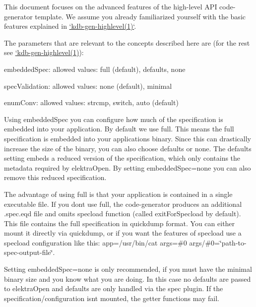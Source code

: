 This document focuses on the advanced features of the high-\/level A\+PI code-\/generator template. We assume you already familiarized yourself with the basic features explained in \hyperlink{doc_help_kdb-gen-highlevel_md}{`kdb-\/gen-\/highlevel(1)`}.

The parameters that are relevant to the concepts described here are (for the rest see \hyperlink{doc_help_kdb-gen-highlevel_md}{`kdb-\/gen-\/highlevel(1)})\+:


\begin{DoxyItemize}
\item {\ttfamily embedded\+Spec}\+: allowed values\+: {\ttfamily full} (default), {\ttfamily defaults}, {\ttfamily none}
\item {\ttfamily spec\+Validation}\+: allowed values\+: {\ttfamily none} (default), {\ttfamily minimal}
\item {\ttfamily enum\+Conv}\+: allowed values\+: {\ttfamily strcmp}, {\ttfamily switch}, {\ttfamily auto} (default)
\end{DoxyItemize}

Using {\ttfamily embedded\+Spec} you can configure how much of the specification is embedded into your application. By default we use {\ttfamily full}. This means the full specification is embedded into your application\textquotesingle{}s binary. Since this can drastically increase the size of the binary, you can also choose {\ttfamily defaults} or {\ttfamily none}. The {\ttfamily defaults} setting embeds a reduced version of the specification, which only contains the metadata required by {\ttfamily elektra\+Open}. By setting {\ttfamily embedded\+Spec=none} you can also remove this reduced specification.

The advantage of using {\ttfamily full} is that your application is contained in a single executable file. If you don\textquotesingle{}t use {\ttfamily full}, the code-\/generator produces an additional {\ttfamily .spec.\+eqd} file and omits specload function (called {\ttfamily exit\+For\+Specload} by default). This file contains the full specification in quickdump format. You can either mount it directly via {\ttfamily quickdump}, or if you want the features of {\ttfamily specload} use a {\ttfamily specload} configuration like this\+: {\ttfamily app=/usr/bin/cat args=\#0 args/\#0=\char`\"{}path-\/to-\/spec-\/output-\/file\char`\"{}}.

Setting {\ttfamily embedded\+Spec=none} is only recommended, if you must have the minimal binary size and you know what you are doing. In this case no defaults are passed to {\ttfamily elektra\+Open} and defaults are only handled via the {\ttfamily spec} plugin. If the specification/configuration isn\textquotesingle{}t mounted, the getter functions may fail.

